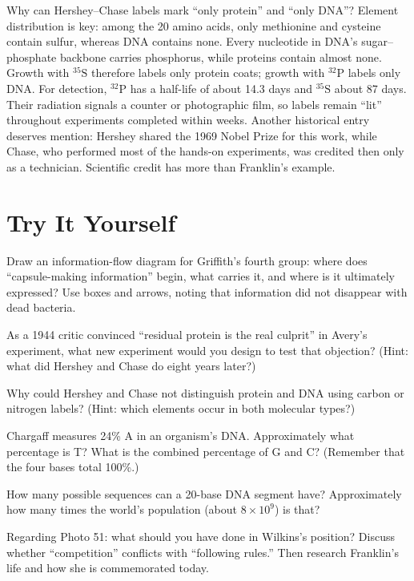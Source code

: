 \begin{tiaozhan}
Why can Hershey--Chase labels mark ``only protein'' and ``only DNA''? Element distribution is key: among the 20 amino acids, only methionine and cysteine contain sulfur, whereas DNA contains none. Every nucleotide in DNA's sugar--phosphate backbone carries phosphorus, while proteins contain almost none. Growth with $^{35}\mathrm{S}$ therefore labels only protein coats; growth with $^{32}\mathrm{P}$ labels only DNA. For detection, $^{32}\mathrm{P}$ has a half-life of about 14.3 days and $^{35}\mathrm{S}$ about 87 days. Their radiation signals a counter or photographic film, so labels remain ``lit'' throughout experiments completed within weeks. Another historical entry deserves mention: Hershey shared the 1969 Nobel Prize for this work, while Chase, who performed most of the hands-on experiments, was credited then only as a technician. Scientific credit has more than Franklin's example.
\end{tiaozhan}

\section*{Try It Yourself}

\begin{sikaoti}
\item Draw an information-flow diagram for Griffith's fourth group: where does ``capsule-making information'' begin, what carries it, and where is it ultimately expressed? Use boxes and arrows, noting that information did not disappear with dead bacteria.
\item As a 1944 critic convinced ``residual protein is the real culprit'' in Avery's experiment, what new experiment would you design to test that objection? (Hint: what did Hershey and Chase do eight years later?)
\item Why could Hershey and Chase not distinguish protein and DNA using carbon or nitrogen labels? (Hint: which elements occur in both molecular types?)
\item Chargaff measures 24\% A in an organism's DNA. Approximately what percentage is T? What is the combined percentage of G and C? (Remember that the four bases total 100\%.)
\item How many possible sequences can a 20-base DNA segment have? Approximately how many times the world's population (about $8\times 10^{9}$) is that?
\item Regarding Photo 51: what should you have done in Wilkins's position? Discuss whether ``competition'' conflicts with ``following rules.'' Then research Franklin's life and how she is commemorated today.
\end{sikaoti}
